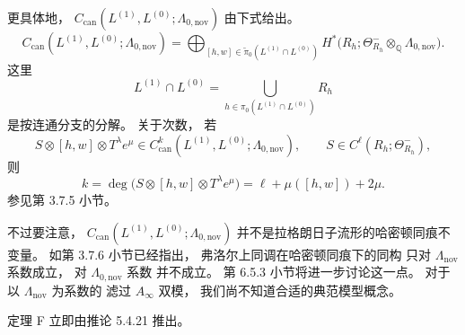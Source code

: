 更具体地，
$C_{\mathrm{can}}(L^{(1)},L^{(0)};
\Lambda_{0,\mathrm{nov}})$
由下式给出。
\[
C_{\mathrm{can}}(L^{(1)},L^{(0)};
\Lambda_{0,\mathrm{nov}})
=
\bigoplus_{
[h,w]\in\widetilde\pi_0
(L^{(1)}\cap L^{(0)})}
H^*\bigl(
R_h;\Theta^-_{R_h}
\otimes_{\mathbb Q}\Lambda_{0,\mathrm{nov}}
\bigr).
\]
这里
\[
L^{(1)}\cap L^{(0)}
=
\bigcup_{h\in\pi_0(L^{(1)}\cap L^{(0)})}
R_h
\]
是按连通分支的分解。
关于次数，
若
\[
S\otimes[h,w]\otimes T^\lambda e^\mu
\in C_{\mathrm{can}}^k
(L^{(1)},L^{(0)};\Lambda_{0,\mathrm{nov}}),
\qquad
S\in C^\ell(R_h;\Theta^-_{R_h}),
\]
则
\[
k
=\deg\bigl(
S\otimes[h,w]\otimes T^\lambda e^\mu
\bigr)
=\ell+\mu([h,w])+2\mu.
\]
参见第 3.7.5 小节。

不过要注意，
$C_{\mathrm{can}}(L^{(1)},L^{(0)};
\Lambda_{0,\mathrm{nov}})$
并不是拉格朗日子流形的哈密顿同痕不变量。
如第 3.7.6 小节已经指出，
弗洛尔上同调在哈密顿同痕下的同构
只对 $\Lambda_{\mathrm{nov}}$ 系数成立，
对 $\Lambda_{0,\mathrm{nov}}$ 系数
并不成立。
第 6.5.3 小节将进一步讨论这一点。
对于以 $\Lambda_{\mathrm{nov}}$ 为系数的
滤过 $A_\infty$ 双模，
我们尚不知道合适的典范模型概念。

定理 F 立即由推论 5.4.21 推出。
